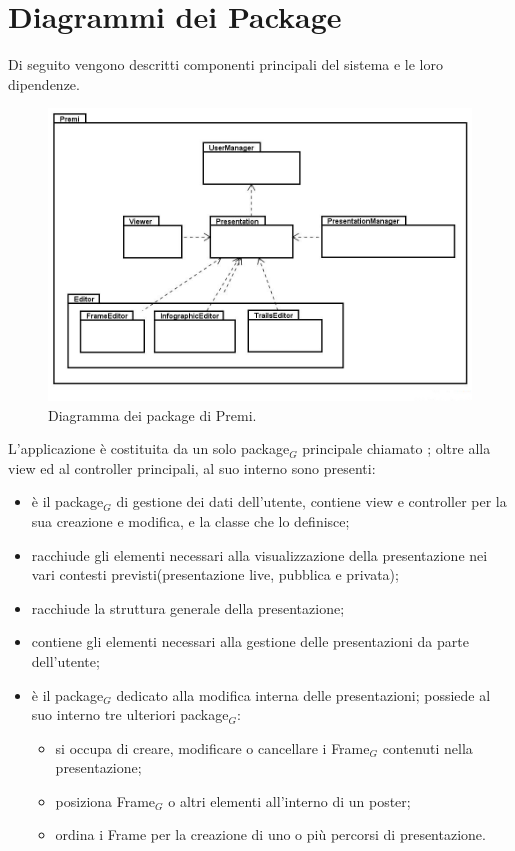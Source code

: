 \newpage
\section{Diagrammi dei Package}
Di seguito vengono descritti componenti principali del sistema e le loro dipendenze.

\begin{figure}[h]
\begin{center}
\includegraphics[scale=0.45]{img/diapkg/pkg.jpg}
\caption{Diagramma dei package di Premi.}
\end{center}
\end{figure}

L'applicazione è costituita da un solo package$_G$ principale chiamato ; oltre alla view ed al controller principali, al suo interno sono presenti:
\begin{itemize}
\item {} è il package$_G$ di gestione dei dati dell'utente, contiene view e controller per la sua creazione e modifica, e la classe che lo definisce;
\item {} racchiude gli elementi necessari alla visualizzazione della presentazione nei vari contesti previsti(presentazione live, pubblica e privata);
\item {} racchiude la struttura generale della presentazione;
\item {} contiene gli elementi necessari alla gestione delle presentazioni da parte dell'utente;
\item {} è il package$_G$ dedicato alla modifica interna delle presentazioni; possiede al suo interno tre ulteriori package$_G$:
\begin{itemize}
\item {} si occupa di creare, modificare o cancellare i Frame$_G$ contenuti nella presentazione;
\item {} posiziona Frame$_G$ o altri elementi all'interno di un poster;
\item {} ordina i Frame per la creazione di uno o più percorsi di presentazione.
\end{itemize}
\end{itemize}
